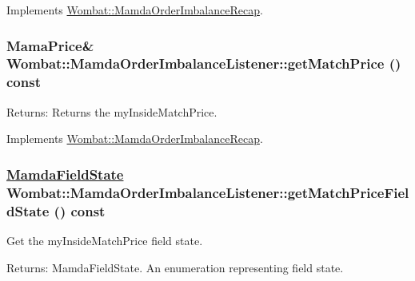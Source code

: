 Implements \hyperlink{classWombat_1_1MamdaOrderImbalanceRecap_a9ffa2d99183cc651c0981c0c310eef9}{Wombat::Mamda\-Order\-Imbalance\-Recap}.\hypertarget{classWombat_1_1MamdaOrderImbalanceListener_d55a2fc95960a2629c498eba6fb8b43d}{
\subsubsection[getMatchPrice]{\setlength{\rightskip}{0pt plus 5cm}Mama\-Price\& Wombat::Mamda\-Order\-Imbalance\-Listener::get\-Match\-Price () const}}
\label{classWombat_1_1MamdaOrderImbalanceListener_d55a2fc95960a2629c498eba6fb8b43d}


\begin{Desc}
\item[Returns:]Returns the my\-Inside\-Match\-Price. \end{Desc}


Implements \hyperlink{classWombat_1_1MamdaOrderImbalanceRecap_fd8f72c21ac091a298c09bde0d4ed146}{Wombat::Mamda\-Order\-Imbalance\-Recap}.\hypertarget{classWombat_1_1MamdaOrderImbalanceListener_ca43f8571100db2c3dc6a81c9ece7d4b}{
\subsubsection[getMatchPriceFieldState]{\setlength{\rightskip}{0pt plus 5cm}\hyperlink{namespaceWombat_93aac974f2ab713554fd12a1fa3b7d2a}{Mamda\-Field\-State} Wombat::Mamda\-Order\-Imbalance\-Listener::get\-Match\-Price\-Field\-State () const}}
\label{classWombat_1_1MamdaOrderImbalanceListener_ca43f8571100db2c3dc6a81c9ece7d4b}


Get the my\-Inside\-Match\-Price field state. 

\begin{Desc}
\item[Returns:]Mamda\-Field\-State. An enumeration representing field state. \end{Desc}


